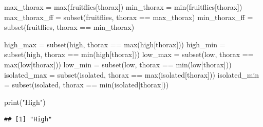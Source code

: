 \documentclass[
]{article}
\newenvironment{Shaded}{\begin{snugshade}}{\end{snugshade}}
\newcommand{\FunctionTok}[1]{\textcolor[rgb]{0.00,0.00,0.00}{#1}}
\newcommand{\NormalTok}[1]{#1}
\newcommand{\OtherTok}[1]{\textcolor[rgb]{0.56,0.35,0.01}{#1}}
\newcommand{\SpecialCharTok}[1]{\textcolor[rgb]{0.00,0.00,0.00}{#1}}
\newcommand{\StringTok}[1]{\textcolor[rgb]{0.31,0.60,0.02}{#1}}
\begin{document}
\begin{Shaded}
\begin{Highlighting}[]
\NormalTok{max\_thorax }\OtherTok{=} \FunctionTok{max}\NormalTok{(fruitflies[}\StringTok{\textquotesingle{}thorax\textquotesingle{}}\NormalTok{])}
\NormalTok{min\_thorax }\OtherTok{=} \FunctionTok{min}\NormalTok{(fruitflies[}\StringTok{\textquotesingle{}thorax\textquotesingle{}}\NormalTok{])}
\NormalTok{max\_thorax\_ff }\OtherTok{=} \FunctionTok{subset}\NormalTok{(fruitflies, thorax }\SpecialCharTok{==}\NormalTok{ max\_thorax)}
\NormalTok{min\_thorax\_ff }\OtherTok{=} \FunctionTok{subset}\NormalTok{(fruitflies, thorax }\SpecialCharTok{==}\NormalTok{ min\_thorax)}

\NormalTok{high\_max }\OtherTok{=} \FunctionTok{subset}\NormalTok{(high, thorax }\SpecialCharTok{==} \FunctionTok{max}\NormalTok{(high[}\StringTok{\textquotesingle{}thorax\textquotesingle{}}\NormalTok{]))}
\NormalTok{high\_min }\OtherTok{=} \FunctionTok{subset}\NormalTok{(high, thorax }\SpecialCharTok{==} \FunctionTok{min}\NormalTok{(high[}\StringTok{\textquotesingle{}thorax\textquotesingle{}}\NormalTok{]))}
\NormalTok{low\_max }\OtherTok{=} \FunctionTok{subset}\NormalTok{(low, thorax }\SpecialCharTok{==} \FunctionTok{max}\NormalTok{(low[}\StringTok{\textquotesingle{}thorax\textquotesingle{}}\NormalTok{]))}
\NormalTok{low\_min }\OtherTok{=} \FunctionTok{subset}\NormalTok{(low, thorax }\SpecialCharTok{==} \FunctionTok{min}\NormalTok{(low[}\StringTok{\textquotesingle{}thorax\textquotesingle{}}\NormalTok{]))}
\NormalTok{isolated\_max }\OtherTok{=} \FunctionTok{subset}\NormalTok{(isolated, thorax }\SpecialCharTok{==} \FunctionTok{max}\NormalTok{(isolated[}\StringTok{\textquotesingle{}thorax\textquotesingle{}}\NormalTok{]))}
\NormalTok{isolated\_min }\OtherTok{=} \FunctionTok{subset}\NormalTok{(isolated, thorax }\SpecialCharTok{==} \FunctionTok{min}\NormalTok{(isolated[}\StringTok{\textquotesingle{}thorax\textquotesingle{}}\NormalTok{]))}

\FunctionTok{print}\NormalTok{(}\StringTok{"High"}\NormalTok{)}
\end{Highlighting}
\end{Shaded}

\begin{verbatim}
## [1] "High"
\end{verbatim}

\begin{Shaded}
\end{Shaded}
\end{document}
